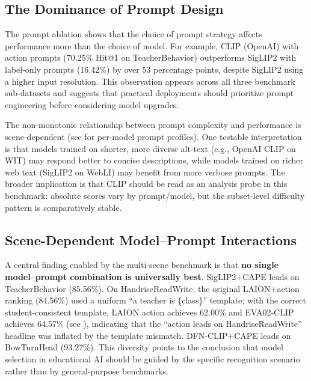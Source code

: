\documentclass[symmetry,article,submit,pdftex,moreauthors]{Definitions/mdpi}
\begin{document}
\subsection{The Dominance of Prompt Design}

The prompt ablation shows that the choice of prompt strategy affects performance more than the choice of model.
For example, CLIP (OpenAI) with action prompts (70.25\% Hit@1 on TeacherBehavior) outperforms SigLIP2 with label-only prompts (16.42\%) by over 53 percentage points, despite SigLIP2 using a higher input resolution.
This observation appears across all three benchmark sub-datasets and suggests that practical deployments should prioritize prompt engineering before considering model upgrades.

The non-monotonic relationship between prompt complexity and performance is scene-dependent (see  for per-model prompt profiles).
One testable interpretation is that models trained on shorter, more diverse alt-text (e.g., OpenAI CLIP on WIT) may respond better to concise descriptions, while models trained on richer web text (SigLIP2 on WebLI) may benefit from more verbose prompts.
The broader implication is that CLIP should be read as an analysis probe in this benchmark: absolute scores vary by prompt/model, but the subset-level difficulty pattern is comparatively stable.

\subsection{Scene-Dependent Model--Prompt Interactions}

A central finding enabled by the multi-scene benchmark is that \textbf{no single model--prompt combination is universally best}.
SigLIP2+CAPE leads on TeacherBehavior (85.56\%). On HandriseReadWrite, the original LAION+action ranking (84.56\%) used a uniform ``a teacher is \{class\}'' template; with the correct student-consistent template, LAION action achieves 62.00\% and EVA02-CLIP achieves 64.57\% (see ), indicating that the ``action leads on HandriseReadWrite'' headline was inflated by the template mismatch. DFN-CLIP+CAPE leads on BowTurnHead (93.27\%).
This diversity points to the conclusion that model selection in educational AI should be guided by the specific recognition scenario rather than by general-purpose benchmarks.
\end{document}

